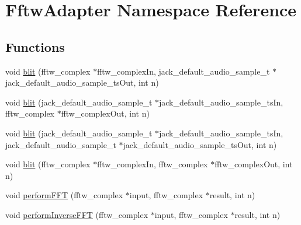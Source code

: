 \hypertarget{namespaceFftwAdapter}{\section{\-Fftw\-Adapter \-Namespace \-Reference}
\label{d5/dfd/namespaceFftwAdapter}
}
\subsection*{\-Functions}
\begin{DoxyCompactItemize}
\item 
void \hyperlink{namespaceFftwAdapter_af16eacc6111835c6344b8cbb600ef8e4}{blit} (fftw\-\_\-complex $\ast$fftw\-\_\-complex\-In, jack\-\_\-default\-\_\-audio\-\_\-sample\-\_\-t $\ast$jack\-\_\-default\-\_\-audio\-\_\-sample\-\_\-ts\-Out, int n)
\item 
void \hyperlink{namespaceFftwAdapter_a46c21b54cb76d7aa8bd92b4dabbd7871}{blit} (jack\-\_\-default\-\_\-audio\-\_\-sample\-\_\-t $\ast$jack\-\_\-default\-\_\-audio\-\_\-sample\-\_\-ts\-In, fftw\-\_\-complex $\ast$fftw\-\_\-complex\-Out, int n)
\item 
void \hyperlink{namespaceFftwAdapter_ae8d6409c3606e181a28b24340e45a173}{blit} (jack\-\_\-default\-\_\-audio\-\_\-sample\-\_\-t $\ast$jack\-\_\-default\-\_\-audio\-\_\-sample\-\_\-ts\-In, jack\-\_\-default\-\_\-audio\-\_\-sample\-\_\-t $\ast$jack\-\_\-default\-\_\-audio\-\_\-sample\-\_\-ts\-Out, int n)
\item 
void \hyperlink{namespaceFftwAdapter_a4388aede2b4e4e6f5731dcb57407cb31}{blit} (fftw\-\_\-complex $\ast$fftw\-\_\-complex\-In, fftw\-\_\-complex $\ast$fftw\-\_\-complex\-Out, int n)
\item 
void \hyperlink{namespaceFftwAdapter_a6e1648d33af4f88a3307e25eee03d945}{perform\-F\-F\-T} (fftw\-\_\-complex $\ast$input, fftw\-\_\-complex $\ast$result, int n)
\item 
void \hyperlink{namespaceFftwAdapter_ae8e0488a742dd23810797b05a737ebd5}{perform\-Inverse\-F\-F\-T} (fftw\-\_\-complex $\ast$input, fftw\-\_\-complex $\ast$result, int n)
\end{DoxyCompactItemize}


